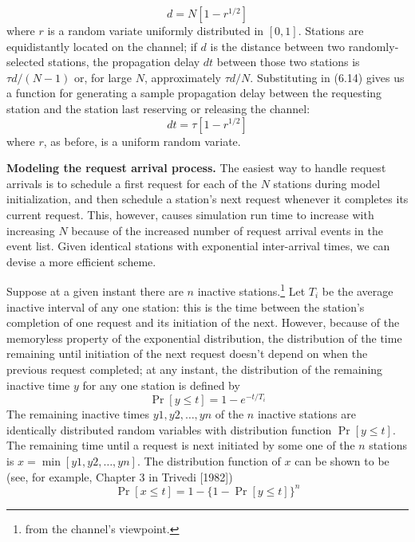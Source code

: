 \begin{equation} d=N[1-r^{1/2}] \end{equation}
where $r$ is a random variate uniformly distributed in $[0,1]$. Stations are equidistantly located on the channel; if $d$ is the distance between two randomly-selected stations, the propagation delay $dt$ between those two stations is $\tau d/(N-1)$ or, for large $N$, approximately $\tau d/N$. Substituting in (6.14) gives us a function for generating a sample propagation delay between the requesting station and the station last reserving or releasing the channel:
\begin{equation} dt=\tau[1-r^{1/2}] \end{equation}
where $r$, as before, is a uniform random variate.

\noindent\textbf{Modeling the request arrival process.} The easiest way to handle request arrivals is to schedule a first request for each of the $N$ stations during model initialization, and then schedule a station's next request whenever it completes its current request. This, however, causes simulation run time to increase with increasing $N$ because of the increased number of request arrival events in the event list. Given identical stations with exponential inter-arrival times, we can devise a more efficient scheme.

Suppose at a given instant there are $n$ inactive stations.\footnote{from the channel's viewpoint.} Let $T_i$ be the average inactive interval of any one station: this is the time between the station's completion of one request and its initiation of the next. However, because of the memoryless property of the exponential distribution, the distribution of the time remaining until initiation of the next request doesn't depend on when the previous request completed; at any instant, the distribution of the remaining inactive time $y$ for any one station is defined by
\begin{equation} \Pr[y\le t]=1-e^{-t/T_i} \end{equation}
The remaining inactive times $y1,y2,\ldots,yn$ of the $n$ inactive stations are identically distributed random variables with distribution function $\Pr[y\le t]$. The remaining time until a request is next initiated by some one of the $n$ stations is $x=\min[y1,y2,\ldots,yn]$. The distribution function of $x$ can be shown to be (see, for example, Chapter 3 in Trivedi [1982])
\begin{equation} \Pr[x\le t]=1-\{1-\Pr[y\le t]\}^n \end{equation}

